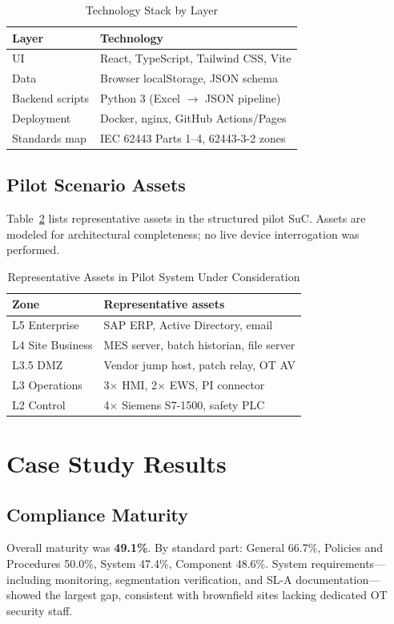 \documentclass[10pt,conference]{IEEEtran}
\begin{document}
\begin{table}[!t]
\caption{Technology Stack by Layer}
\label{tab:stack}
\centering
\small
\begin{tabular}{ll}
\hline
Layer & Technology \\
\hline
UI & React, TypeScript, Tailwind CSS, Vite \\
Data & Browser localStorage, JSON schema \\
Backend scripts & Python 3 (Excel $\rightarrow$ JSON pipeline) \\
Deployment & Docker, nginx, GitHub Actions/Pages \\
Standards map & IEC 62443 Parts 1--4, 62443-3-2 zones \\
\hline
\end{tabular}
\end{table}

\subsection{Pilot Scenario Assets}
Table~\ref{tab:assets} lists representative assets in the structured pilot SuC. Assets are modeled for architectural completeness; no live device interrogation was performed.

\begin{table}[!t]
\caption{Representative Assets in Pilot System Under Consideration}
\label{tab:assets}
\centering
\small
\begin{tabular}{ll}
\hline
Zone & Representative assets \\
\hline
L5 Enterprise & SAP ERP, Active Directory, email \\
L4 Site Business & MES server, batch historian, file server \\
L3.5 DMZ & Vendor jump host, patch relay, OT AV \\
L3 Operations & 3$\times$ HMI, 2$\times$ EWS, PI connector \\
L2 Control & 4$\times$ Siemens S7-1500, safety PLC \\
\hline
\end{tabular}
\end{table}

\section{Case Study Results}
\subsection{Compliance Maturity}
Overall maturity was \textbf{49.1\%}. By standard part: General 66.7\%, Policies and Procedures 50.0\%, System 47.4\%, Component 48.6\%. System requirements---including monitoring, segmentation verification, and SL-A documentation---showed the largest gap, consistent with brownfield sites lacking dedicated OT security staff.
\end{document}

